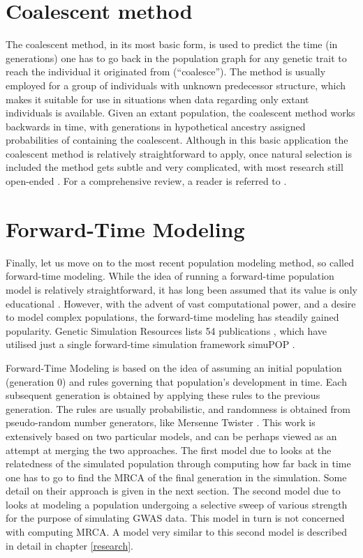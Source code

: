 \documentclass{l4proj}
\begin{document}
\section{Coalescent method}

The coalescent method, in its most basic form, is used to predict the time (in generations) one has to go back in the population graph for any genetic trait to reach the individual it originated from (``coalesce''). The method is usually employed for a group of individuals with unknown predecessor structure, which makes it suitable for use in situations when data regarding only extant individuals is available. Given an extant population, the coalescent method works backwards in time, with generations in hypothetical ancestry assigned probabilities of containing the coalescent. Although in this basic application the coalescent method is relatively straightforward to apply, once natural selection is included the method gets subtle and very complicated, with most research still open-ended \parencite{Wakeley16}. For a comprehensive review, a reader is referred to \cite{Wakeley16}. 

\section{Forward-Time Modeling}

Finally, let us move on to the most recent population modeling method, so called forward-time modeling. While the idea of running a forward-time population model is relatively straightforward, it has long been assumed that its value is only educational \parencite{peng05}. However, with the advent of vast computational power, and a desire to model complex populations, the forward-time modeling has steadily gained popularity. Genetic Simulation Resources lists 54 publications \parencite{GSR16}, which have utilised just a single forward-time simulation framework simuPOP \parencite{peng05}.

Forward-Time Modeling is based on the idea of assuming an initial population (generation 0) and rules governing that population's development in time. Each subsequent generation is obtained by applying these rules to the previous generation. The rules are usually probabilistic, and randomness is obtained from pseudo-random number generators, like Mersenne Twister \parencite{Matsumoto98}. This work is extensively based on two particular models, and can be perhaps viewed as an attempt at merging the two approaches. The first model due to \cite{rohde04} looks at the relatedness of the simulated population through computing how far back in time one has to go to find the \gls{MRCA} of the final generation in the simulation. Some detail on their approach is given in the next section. The second model due to \cite{peng10} looks at modeling a population undergoing a \gls{selective sweep} of various strength for the purpose of simulating GWAS data. This model in turn is not concerned with computing MRCA. A model very similar to this second model is described in detail in chapter \ref{research}.
\end{document}
